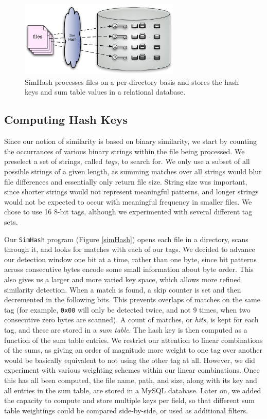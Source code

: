 \documentclass[10pt, twocolumn]{article}
\begin{document}
 \begin{figure}[h] 
 \centering
\includegraphics[width= 3in]{processFile.pdf}
\caption{SimHash processes files on a per-directory basis and stores the hash keys and sum table values in a relational database.}
\label{processingFiles} 
\end{figure}   

\subsection{Computing Hash Keys}

Since our notion of similarity is based on binary similarity, we start by counting the occurrances of various binary strings within the file being processed.  We preselect a set of strings, called {\it tags}, to search for.  We only use a subset of all possible strings of a given length, as summing matches over all strings would blur file differences and essentially only return file size.  String size was important, since shorter strings would not represent meaningful patterns, and longer strings would not be expected to occur with meaningful frequency in smaller files.  We chose to use 16 8-bit tags, although we experimented with several different tag sets.

Our {\tt SimHash} program (Figure \ref{simHash}) opens each file in a directory, scans through it, and looks for matches with each of our tags.  We decided to advance our detection window one bit at a time, rather than one byte, since bit patterns across consecutive bytes encode some small information about byte order.  This also gives us a larger and more varied key space, which allows more refined similarity detection.  When a match is found, a skip counter is set and then decremented in the following bits.  This prevents overlaps of matches on the same tag (for example, {\tt 0x00} will only be detected twice, and not 9 times, when two consecutive zero bytes are scanned).  A count of matches, or {\it hits}, is kept for each tag, and these are stored in a {\it sum table}.  The hash key is then computed as a function of the sum table entries.  We restrict our attention to linear combinations of the sums, as giving an order of magnitude more weight to one tag over another would be basically equivalent to not using the other tag at all.  However, we did experiment with various weighting schemes within our linear combinations.  Once this has all been computed, the file name, path, and size, along with its key and all entries in the sum table, are stored in  a MySQL database.  Later on, we added the capacity to compute and store multiple keys per field, so that different sum table weightings could be compared side-by-side, or used as additional filters.
\end{document}
